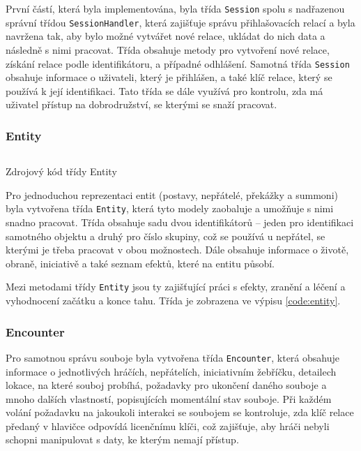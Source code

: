 První částí, která byla implementována, byla třída \texttt{Session} spolu s nadřazenou správní třídou \texttt{SessionHandler}, která zajišťuje správu přihlašovacích relací a byla navržena tak, aby bylo možné vytvářet nové relace, ukládat do nich data a následně s nimi pracovat. Třída obsahuje metody pro vytvoření nové relace, získání relace podle identifikátoru, a případné odhlášení. Samotná třída \texttt{Session} obsahuje informace o uživateli, který je přihlášen, a také klíč relace, který se používá k její identifikaci. Tato třída se dále využívá pro kontrolu, zda má uživatel přístup na dobrodružství, se kterými se snaží pracovat.

\subsubsection*{Entity}
\label{subsubsec:impl_entity}

\begin{listing}[H]
    \inputminted{Java}{code/EncounterEntity.java}
    \caption{Zdrojový kód třídy Entity}
    \label{code:entity}
\end{listing}

Pro jednoduchou reprezentaci entit (postavy, nepřátelé, překážky a summoni) byla vytvořena třída \texttt{Entity}, která tyto modely zaobaluje a umožňuje s nimi snadno pracovat. Třída obsahuje sadu dvou identifikátorů -- jeden pro identifikaci samotného objektu a druhý pro číslo skupiny, což se používá u nepřátel, se kterými je třeba pracovat v obou možnostech. Dále obsahuje informace o životě, obraně, iniciativě a také seznam efektů, které na entitu působí.

Mezi metodami třídy \texttt{Entity} jsou ty zajišťující práci s efekty, zranění a léčení a vyhodnocení začátku a konce tahu. Třída je zobrazena ve výpisu \ref{code:entity}.

\subsubsection*{Encounter}
\label{subsubsec:impl_encounter}

Pro samotnou správu souboje byla vytvořena třída \texttt{Encounter}, která obsahuje informace o jednotlivých hráčích, nepřátelích, iniciativním žebříčku, detailech lokace, na které souboj probíhá, požadavky pro ukončení daného souboje a mnoho dalších vlastností, popisujících momentální stav souboje. Při každém volání požadavku na jakoukoli interakci se soubojem se kontroluje, zda klíč relace předaný v hlavičce odpovídá licenčnímu klíči, což zajišťuje, aby hráči nebyli schopni manipulovat s daty, ke kterým nemají přístup.

